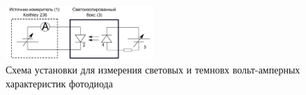 
\begin{figure}[h]
    \centering
    \includegraphics[width=0.5\textwidth]{figures/exp.png}
    \caption{Схема установки для измерения световых и темновх вольт-амперных характеристик фотодиода}
    \label{fig:01}
\end{figure}





\newpage

